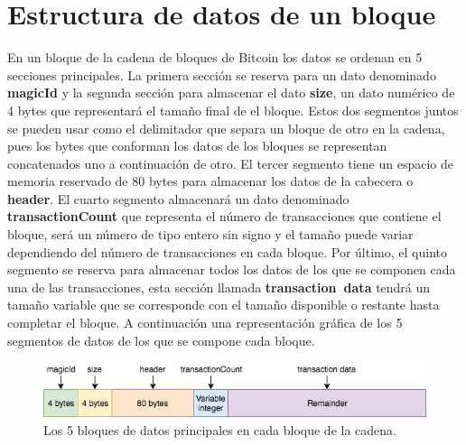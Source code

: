 \documentclass{article}
\begin{document}
\section{Estructura de datos de un bloque}
    
    \vspace{3mm}
    
     En un bloque de la cadena de bloques de Bitcoin los datos se ordenan en 5 secciones principales. La primera sección se reserva para un dato denominado \textbf{magicId} y la segunda sección para almacenar el dato \textbf{size}, un dato numérico de 4 bytes que representará el tamaño final de el bloque. Estos dos segmentos juntos se pueden usar como el delimitador que separa un bloque de otro en la cadena, pues los bytes que conforman los datos de los bloques se representan concatenados uno a continuación de otro. El tercer segmento tiene un espacio de memoria reservado de 80 bytes para almacenar los datos de la cabecera o \textbf{header}. El cuarto segmento almacenará un dato denominado \textbf{transactionCount} que representa el número de transacciones que contiene el bloque, será un número de tipo entero sin signo y el tamaño puede variar dependiendo del número de transacciones en cada bloque. Por último, el quinto segmento se reserva para almacenar todos los datos de los que se componen cada una de las transacciones, esta sección llamada \textbf{transaction\ data} tendrá un tamaño variable que se corresponde con el tamaño disponible o restante hasta completar el bloque. A continuación una representación gráfica de los 5 segmentos de datos de los que se compone cada bloque.
    
    \begin{figure}[H]
    \centering
        \includegraphics[scale=0.57]{img/Bitcoin_SHA_256-Block_data}
        \caption{Los 5 bloques de datos principales en cada bloque de la cadena.}
    \end{figure}
    
\end{document}
